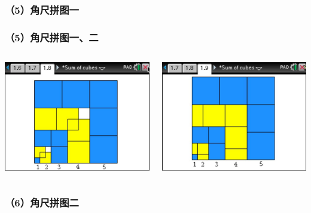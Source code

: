 \documentclass[aspectratio=169]{beamer}
\begin{document}
\subsubsection{（5）角尺拼图一}
   \begin{frame}
   \frametitle{（5）角尺拼图一、二}
        \begin{columns}
       	\includegraphics[scale=0.3]{角尺拼图一.jpg}
       	
       	\includegraphics[scale=0.3]{角尺拼图二.jpg}
       \end{columns}      
   \end{frame}
\subsubsection{（6）角尺拼图二}
\end{document}
